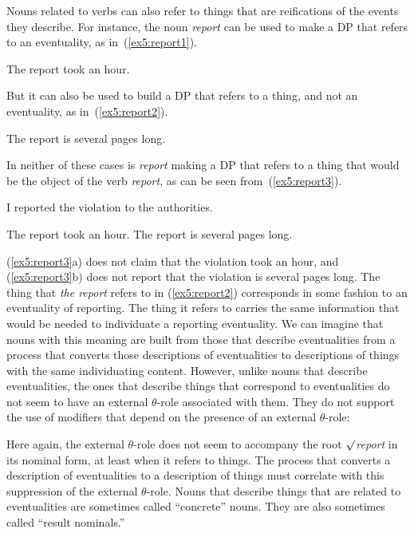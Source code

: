 Nouns related to verbs can also refer to things that are reifications of the events they describe. For instance, the noun \emph{report} can be used to make a DP that refers to an eventuality, as in~(\ref{ex5:report1}).
\begin{exe}
	\raggedright
	\ex \label{ex5:report1} 
	The report took an hour.
\end{exe}
But it can also be used to build a DP that refers to a thing, and not an eventuality, as in~(\ref{ex5:report2}).
\begin{exe}
	\raggedright
	\ex \label{ex5:report2} 
	The report is several pages long.
\end{exe}
In neither of these cases is \emph{report} making a DP that refers to a thing that would be the object of the verb \emph{report}, as can be seen from~(\ref{ex5:report3}).
\begin{exe}
	\raggedright
	\ex \label{ex5:report3} 
	I reported the violation to the authorities.
	\begin{xlist}
		\ex The report took an hour.
		\ex The report is several pages long.
	\end{xlist}
\end{exe}
(\ref{ex5:report3}a) does not claim that the violation took an hour, and (\ref{ex5:report3}b) does not report that the violation is several pages long. The thing that \emph{the report} refers to in (\ref{ex5:report2}) corresponds in some fashion to an eventuality of reporting. The thing it refers to carries the same information that would be needed to individuate a reporting eventuality. We can imagine that nouns with this meaning are built from those that describe eventualities from a process that converts those descriptions of eventualities to descriptions of things with the same individuating content. However, unlike nouns that describe eventualities, the ones that describe things that correspond to eventualities do not seem to have an external $\theta$-role associated with them. They do not support the use of modifiers that depend on the presence of an external $\theta$-role:
\begin{exe}
	\raggedright
\end{exe}
Here again, the external $\theta$-role does not seem to accompany the root \emph{$\surd$report} in its nominal form, at least when it refers to things. The process that converts a description of eventualities to a description of things must correlate with this suppression of the external $\theta$-role. Nouns that describe things that are related to eventualities are sometimes called ``concrete'' nouns. They are also sometimes called ``result nominals.'' 

